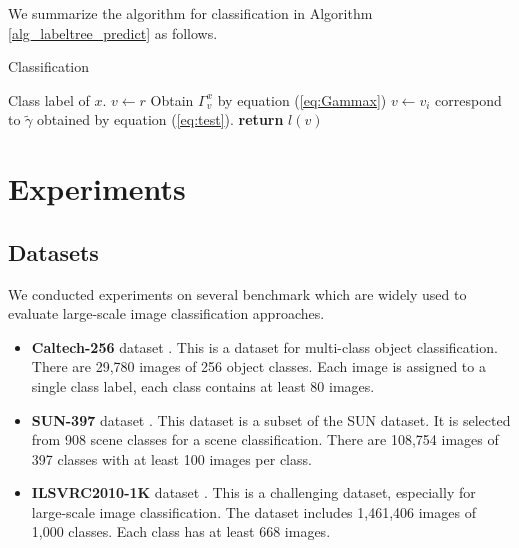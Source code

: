 \documentclass[review]{elsarticle}
\begin{document}
We summarize the algorithm for classification in Algorithm \ref{alg_labeltree_predict} as follows.
\begin{algorithm}
  	\caption {Classification } \label{alg_labeltree_predict}
  	\begin{algorithmic}[1]
  		\show\LOOP
  		
  		\Ensure   Class label of $x$.
		\State $v \gets r$
			\State Obtain  $\Gamma_{v}^x$ by equation (\ref{eq:Gammax})
	    	\State $v \gets v_i$ correspond to $\tilde{\gamma}$ obtained by equation (\ref{eq:test}).		
    	\EndWhile
    	\State \textbf{return} { ${l}(v)$}
	\end{algorithmic}
\end{algorithm}


\section{Experiments} \label{sec:experiments}
\subsection{Datasets}
We conducted experiments on several benchmark which are widely used to evaluate large-scale image classification approaches.  

\begin{itemize}
\item \textbf{Caltech-256} dataset \cite{GriffinCaltech256}. This is a dataset for multi-class object classification. There are 29,780 images of 256 object classes. Each image is assigned to a single class label, each class contains at least 80 images. 

\item \textbf{SUN-397} dataset \cite{SUN2010}. This dataset is a subset of the SUN dataset. It is selected from 908 scene classes for a scene classification. There are 108,754 images of 397 classes with at least 100 images per class.

\item \textbf{ILSVRC2010-1K} dataset \cite{ILSVRC15}. This is a challenging dataset, especially for large-scale image classification. The dataset includes 1,461,406 images of 1,000 classes. Each class has at least 668 images.
\end{itemize}
\end{document}
